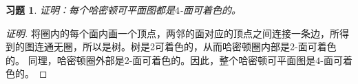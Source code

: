\documentclass{article}
\begin{document}
\begin{CJK}{UTF8}{gbsn}
\newtheorem*{Ex}{习题}
\begin{Ex}
证明：每个哈密顿可平面图都是$4$-面可着色的。
\end{Ex}
\begin{proof}[证明]
将圈内的每个面内画一个顶点，两邻的面对应的顶点之间连接一条边，所得到的图连通无圈，所以是树。树是2可着色的，从而哈密顿圈内部是2-面可着色的。
同理，哈密顿圈外部是2-面可着色的。因此，整个哈密顿可平面图是$4$-面可着色的。
\end{proof}
\end{CJK}
\end{document}

